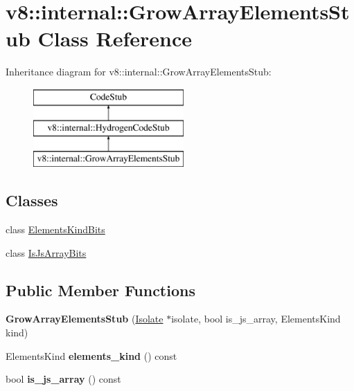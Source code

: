 \hypertarget{classv8_1_1internal_1_1_grow_array_elements_stub}{}\section{v8\+:\+:internal\+:\+:Grow\+Array\+Elements\+Stub Class Reference}
\label{classv8_1_1internal_1_1_grow_array_elements_stub}
Inheritance diagram for v8\+:\+:internal\+:\+:Grow\+Array\+Elements\+Stub\+:\begin{figure}[H]
\begin{center}
\leavevmode
\includegraphics[height=3.000000cm]{classv8_1_1internal_1_1_grow_array_elements_stub}
\end{center}
\end{figure}
\subsection*{Classes}
\begin{DoxyCompactItemize}
\item 
class \hyperlink{classv8_1_1internal_1_1_grow_array_elements_stub_1_1_elements_kind_bits}{Elements\+Kind\+Bits}
\item 
class \hyperlink{classv8_1_1internal_1_1_grow_array_elements_stub_1_1_is_js_array_bits}{Is\+Js\+Array\+Bits}
\end{DoxyCompactItemize}
\subsection*{Public Member Functions}
\begin{DoxyCompactItemize}
\item 
{\bfseries Grow\+Array\+Elements\+Stub} (\hyperlink{classv8_1_1internal_1_1_isolate}{Isolate} $\ast$isolate, bool is\+\_\+js\+\_\+array, Elements\+Kind kind)\hypertarget{classv8_1_1internal_1_1_grow_array_elements_stub_a6a3cdf4360af1f84a5a2f2e1a9cb8ab4}{}\label{classv8_1_1internal_1_1_grow_array_elements_stub_a6a3cdf4360af1f84a5a2f2e1a9cb8ab4}

\item 
Elements\+Kind {\bfseries elements\+\_\+kind} () const \hypertarget{classv8_1_1internal_1_1_grow_array_elements_stub_a0ab3a3c933ca6c972f583dbf482f7484}{}\label{classv8_1_1internal_1_1_grow_array_elements_stub_a0ab3a3c933ca6c972f583dbf482f7484}

\item 
bool {\bfseries is\+\_\+js\+\_\+array} () const \hypertarget{classv8_1_1internal_1_1_grow_array_elements_stub_acddee35316fbbed88b5a7665a631e8db}{}\label{classv8_1_1internal_1_1_grow_array_elements_stub_acddee35316fbbed88b5a7665a631e8db}

\end{DoxyCompactItemize}
